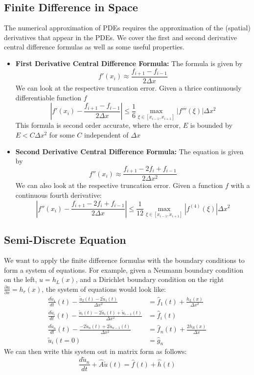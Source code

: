 \documentclass[11pt]{article}
\begin{document}
\subsection{Finite Difference in Space}
The numerical approximation of PDEs requires the approximation of the (spatial) derivatives that appear in the PDEs.  We cover the first and second derivative central difference formulas as well as some useful properties.
\begin{itemize}
\item \textbf{First Derivative Central Difference Formula:} The formula is given by 
$$ f'(x_i) \approx \frac{f_{i+1}- f_{i-1}}{2\Delta x}$$ 
We can look at the respective truncation error. Given a thrice continuously differentiable function $f$
$$ \left|  f'(x_i) - \frac{f_{i+1}- f_{i-1}}{2\Delta x} \right| \leq \frac{1}{6} \max_{\xi \in [x_{i-1}, x_{i+1}]} \left|f'''(\xi) \right| \Delta x^2 $$
This formula is second order accurate, where the error, $E$ is bounded by $E < C\Delta x^2$ for some $C$ independent of $\Delta x$
\item \textbf{Second Derivative Central Difference Formula:} The equation is given by $$ f''(x_i) \approx \frac{f_{i+1}-2 f_i+ f_{i-1}}{2\Delta x^2}$$ We can also look at the respective truncation error. Given a function $f$ with a continuous fourth derivative:
$$ \left|  f''(x_i) - \frac{f_{i+1}-2 f_i + f_{i-1}}{2\Delta x} \right| \leq \frac{1}{12} \max_{\xi \in [x_{i-1}, x_{i+1}]} \left|f^{(4)}(\xi) \right| \Delta x^2 $$
\end{itemize}


\subsection{Semi-Discrete Equation}
We want to apply the finite difference formulas with the boundary conditions to form a system of equations. For example, given a Neumann boundary condition on the left, $u = h_L(x)$, and a Dirichlet boundary condition on the right $\frac{\partial u}{\partial x} = h_r(x)$, the system of equations would look like:
\begin{align*}
\frac{d \tilde{u}_1}{dt} (t) - \frac{\tilde{u}_2 (t) - 2\tilde{u}_1(t)}{\Delta x^2} &= \hat{f}_1(t) + \frac{h_L(x)}{\Delta x^2} \\ 
\frac{d \tilde{u}_i}{dt} (t) - \frac{\tilde{u}_i(t) - 2\tilde{u}_i (t) + \tilde{u}_{i-1}(t)}{\Delta x^2} &= \hat{f}_i(t)\\ 
\frac{d \tilde{u}_n}{dt} (t) - \frac{-2\tilde{u}_n (t) + 2\tilde{u}_{n-1}(t)}{\Delta x^2} &= \hat{f}_n(t) + \frac{2h_R(x)}{\Delta x} \\ 
\tilde{u}_i(t=0) &= \hat{g}_n  
\end{align*}
We can then write this system out in matrix form as follows:
$$ \frac{d \tilde{u}_n}{dt} + \hat{A} \tilde{u}(t) = \hat{f}(t) + \hat{h}(t)$$
\end{document}

